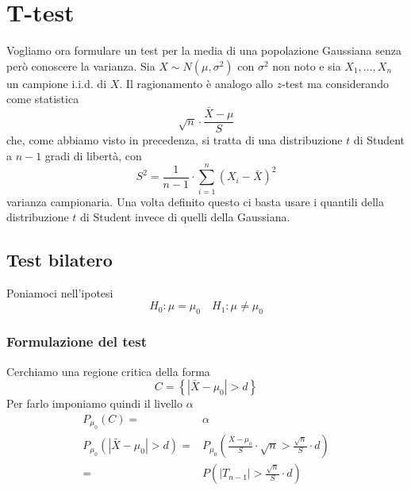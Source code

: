 \section{T-test}
Vogliamo ora formulare un test per la media di una popolazione Gaussiana senza però conoscere la
varianza. Sia $X \sim N(\mu, \sigma^2)$ con $\sigma^2$ non noto e sia $X_1, \dots, X_n$ un campione
i.i.d. di $X$. Il ragionamento è analogo allo $z$-test ma considerando come statistica
\[ \sqrt{n} \cdot \frac{\bar{X} - \mu}{S} \]
che, come abbiamo visto in precedenza, si tratta di una distribuzione $t$ di Student a $n-1$ gradi
di libertà, con
\[ S^2 = \frac{1}{n-1} \cdot \sum_{i=1}^n \left( X_i - \bar{X} \right)^2 \]
varianza campionaria. Una volta definito questo ci basta usare i quantili della distribuzione $t$
di Student invece di quelli della Gaussiana.

\subsection{Test bilatero}
Poniamoci nell'ipotesi
\[ H_0: \mu = \mu_0 \quad H_1: \mu \neq \mu_0 \]

\subsubsection{Formulazione del test}
Cerchiamo una regione critica della forma
\[ C = \left\{ |\bar{X} - \mu_0| > d \right\} \]
Per farlo imponiamo quindi il livello $\alpha$
\begin{align*}
	P_{\mu_0} (C) =                     & \alpha \\
	P_{\mu_0} (|\bar{X} - \mu_0| > d) = &
	P_{\mu_0} \left( \frac{\bar{X} - \mu_0}{S} \cdot \sqrt{n} >
	\frac{\sqrt{n}}{S} \cdot d \right)           \\
	=                                   &
	P \left( |T_{n-1}| > \frac{\sqrt{n}}{S} \cdot d \right)
\end{align*}
